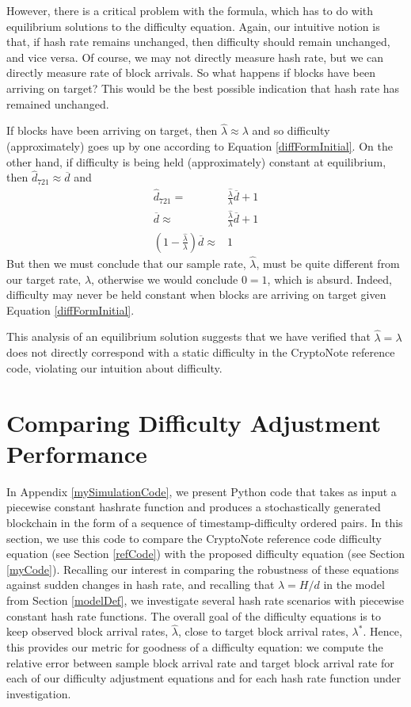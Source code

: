 \documentclass[12pt,english]{mrl}
\theoremstyle{definition}
\numberwithin{equation}{section}
\numberwithin{figure}{section}
\numberwithin{equation}{section}
\numberwithin{equation}{section}
\numberwithin{figure}{section}
\begin{document}
However, there is a critical problem with the formula, which has to do with equilibrium solutions to the difficulty equation. Again, our intuitive notion is that, if hash rate remains unchanged, then difficulty should remain unchanged, and vice versa. Of course, we may not directly measure hash rate, but we can directly measure rate of block arrivals. So what happens if blocks have been arriving on target? This would be the best possible indication that hash rate has remained unchanged.

If blocks have been arriving on target, then $\hat{\lambda} \approx \lambda$ and so difficulty (approximately) goes up by one according to Equation \ref{diffFormInitial}.  On the other hand, if difficulty is being held (approximately) constant at equilibrium, then $\hat{d}_{721} \approx \overline{d}$ and
\begin{align*}
\hat{d}_{721} =& \frac{\hat{\lambda}}{\lambda} \overline{d} + 1\\
\overline{d} \approx& \frac{\hat{\lambda}}{\lambda} \overline{d} + 1\\
(1 - \frac{\hat{\lambda}}{\lambda})\overline{d} \approx& 1
\end{align*}
But then we must conclude that our sample rate, $\hat{\lambda}$, must be quite different from our target rate, $\lambda$, otherwise we would conclude $0 = 1$, which is absurd. Indeed, difficulty may never be held constant when blocks are arriving on target given Equation \ref{diffFormInitial}.

This analysis of an equilibrium solution suggests that we have verified that $\hat{\lambda} = \lambda$ does not directly correspond with a static difficulty in the CryptoNote reference code, violating our intuition about difficulty.

\section{Comparing Difficulty Adjustment Performance}\label{comp}

In Appendix \ref{mySimulationCode}, we present Python code that takes as input a piecewise constant hashrate function and produces a stochastically generated blockchain in the form of a sequence of timestamp-difficulty ordered pairs. In this section, we use this code to compare the CryptoNote reference code difficulty equation (see Section \ref{refCode}) with the proposed difficulty equation (see Section \ref{myCode}). Recalling our interest in comparing the robustness of these equations against sudden changes in hash rate, and recalling that $\lambda = H/d$ in the model from Section \ref{modelDef}, we investigate several hash rate scenarios with piecewise constant hash rate functions. The overall goal of the difficulty equations is to keep observed block arrival rates, $\hat{\lambda}$, close to target block arrival rates, $\lambda^{*}$. Hence, this provides our metric for goodness of a difficulty equation: we compute the relative error between sample block arrival rate and target block arrival rate for each of our difficulty adjustment equations and for each hash rate function under investigation.
\end{document}
